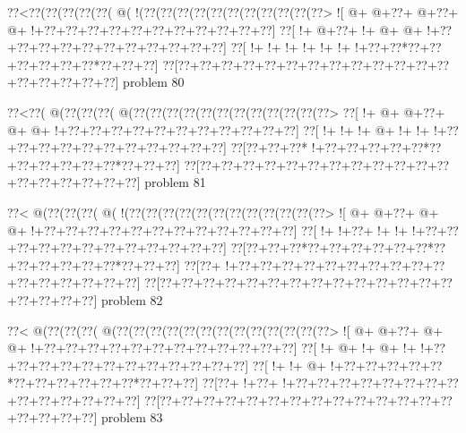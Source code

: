 \vbox{\vbox{\goo
\0??<\0??(\0??(\0??(\0??(\0??(\- @(\- !(\0??(\0??(\0??(\0??(\0??(\0??(\0??(\0??(\0??(\0??(\0??>
\- ![\- @+\- @+\0??+\- @+\0??+\- @+\- !+\0??+\0??+\0??+\0??+\0??+\0??+\0??+\0??+\0??+\0??+\0??]
\0??[\- !+\- @+\0??+\- !+\- @+\- @+\- !+\0??+\0??+\0??+\0??+\0??+\0??+\0??+\0??+\0??+\0??+\0??]
\0??[\- !+\- !+\- !+\- !+\- !+\- !+\- !+\0??+\0??*\0??+\0??+\0??+\0??+\0??+\0??*\0??+\0??+\0??]
\0??[\0??+\0??+\0??+\0??+\0??+\0??+\0??+\0??+\0??+\0??+\0??+\0??+\0??+\0??+\0??+\0??+\0??+\0??]
}
\hfil problem 80\hfil\break
}



\vbox{\vbox{\goo
\0??<\0??(\- @(\0??(\0??(\0??(\- @(\0??(\0??(\0??(\0??(\0??(\0??(\0??(\0??(\0??(\0??(\0??(\0??>
\0??[\- !+\- @+\- @+\0??+\- @+\- @+\- !+\0??+\0??+\0??+\0??+\0??+\0??+\0??+\0??+\0??+\0??+\0??]
\0??[\- !+\- !+\- !+\- @+\- !+\- !+\- !+\0??+\0??+\0??+\0??+\0??+\0??+\0??+\0??+\0??+\0??+\0??]
\0??[\0??+\0??+\0??*\- !+\0??+\0??+\0??+\0??+\0??*\0??+\0??+\0??+\0??+\0??+\0??*\0??+\0??+\0??]
\0??[\0??+\0??+\0??+\0??+\0??+\0??+\0??+\0??+\0??+\0??+\0??+\0??+\0??+\0??+\0??+\0??+\0??+\0??]
}
\hfil problem 81\hfil\break
}



\vbox{\vbox{\goo
\0??<\- @(\0??(\0??(\0??(\- @(\- !(\0??(\0??(\0??(\0??(\0??(\0??(\0??(\0??(\0??(\0??(\0??(\0??>
\- ![\- @+\- @+\0??+\- @+\- @+\- !+\0??+\0??+\0??+\0??+\0??+\0??+\0??+\0??+\0??+\0??+\0??+\0??]
\0??[\- !+\- !+\0??+\- !+\- !+\- !+\0??+\0??+\0??+\0??+\0??+\0??+\0??+\0??+\0??+\0??+\0??+\0??]
\0??[\0??+\0??+\0??*\0??+\0??+\0??+\0??+\0??+\0??*\0??+\0??+\0??+\0??+\0??+\0??*\0??+\0??+\0??]
\0??[\0??+\- !+\0??+\0??+\0??+\0??+\0??+\0??+\0??+\0??+\0??+\0??+\0??+\0??+\0??+\0??+\0??+\0??]
\0??[\0??+\0??+\0??+\0??+\0??+\0??+\0??+\0??+\0??+\0??+\0??+\0??+\0??+\0??+\0??+\0??+\0??+\0??]
}
\hfil problem 82\hfil\break
}



\vbox{\vbox{\goo
\0??<\- @(\0??(\0??(\0??(\- @(\0??(\0??(\0??(\0??(\0??(\0??(\0??(\0??(\0??(\0??(\0??(\0??(\0??>
\- ![\- @+\- @+\0??+\- @+\- @+\- !+\0??+\0??+\0??+\0??+\0??+\0??+\0??+\0??+\0??+\0??+\0??+\0??]
\0??[\- !+\- @+\- !+\- @+\- !+\- !+\0??+\0??+\0??+\0??+\0??+\0??+\0??+\0??+\0??+\0??+\0??+\0??]
\0??[\- !+\- !+\- @+\- !+\0??+\0??+\0??+\0??+\0??*\0??+\0??+\0??+\0??+\0??+\0??*\0??+\0??+\0??]
\0??[\0??+\- !+\0??+\- !+\0??+\0??+\0??+\0??+\0??+\0??+\0??+\0??+\0??+\0??+\0??+\0??+\0??+\0??]
\0??[\0??+\0??+\0??+\0??+\0??+\0??+\0??+\0??+\0??+\0??+\0??+\0??+\0??+\0??+\0??+\0??+\0??+\0??]
}
\hfil problem 83\hfil\break
}



